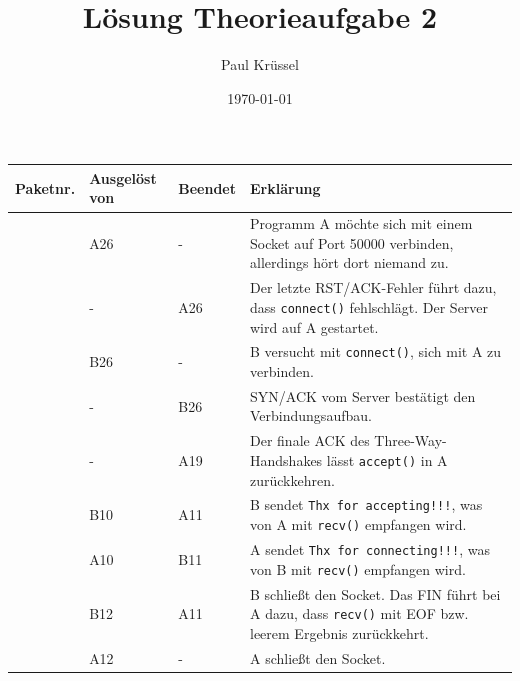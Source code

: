 \documentclass{kdiartcl}
\institute{Fachbereich Angewandte Informatik}
\date{\today}
\author{Paul Krüssel}
\title{Lösung Theorieaufgabe 2}
\begin{document}
\maketitle

\begin{tabularx}{\textwidth}{|>{\centering\arraybackslash}p{1.3cm}
                            |>{\centering\arraybackslash}p{2.2cm}
                            |>{\centering\arraybackslash}p{2.2cm}
                            |Y|}
    \hline
    Paketnr. & Ausgelöst von & Beendet & Erklärung \\
     & A26 & - & Programm A möchte sich mit einem Socket auf Port 50000 verbinden, allerdings hört dort niemand zu. \\
     & - & A26 & Der letzte RST/ACK-Fehler führt dazu, dass \texttt{connect()} fehlschlägt. Der Server wird auf A gestartet. \\
     & B26 & - & B versucht mit \texttt{connect()}, sich mit A zu verbinden. \\
     & - & B26 & SYN/ACK vom Server bestätigt den Verbindungsaufbau. \\
     & - & A19 & Der finale ACK des Three-Way-Handshakes lässt \texttt{accept()} in A zurückkehren. \\
     & B10 & A11 & B sendet \texttt{Thx for accepting!!!}, was von A mit \texttt{recv()} empfangen wird. \\
     & A10 & B11 & A sendet \texttt{Thx for connecting!!!}, was von B mit \texttt{recv()} empfangen wird. \\
     & B12 & A11 & B schließt den Socket. Das FIN führt bei A dazu, dass \texttt{recv()} mit EOF bzw. leerem Ergebnis zurückkehrt. \\
     & A12 & - & A schließt den Socket. \\
    \hline
\end{tabularx}
\end{document}
